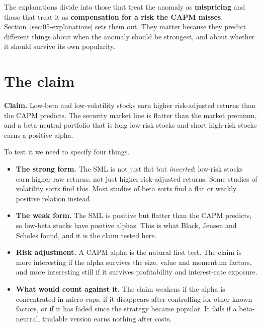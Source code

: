 The explanations divide into those that treat the anomaly as \textbf{mispricing} and those that treat it as \textbf{compensation for a risk the CAPM misses}. Section~\ref{sec:05-explanations} sets them out. They matter because they predict different things about when the anomaly should be strongest, and about whether it should survive its own popularity.

\section{The claim}
\label{sec:05-claim}

\begin{callout}
\textbf{Claim.} Low-beta and low-volatility stocks earn higher risk-adjusted returns than the CAPM predicts. The security market line is flatter than the market premium, and a beta-neutral portfolio that is long low-risk stocks and short high-risk stocks earns a positive alpha.
\end{callout}

To test it we need to specify four things.

\begin{itemize}
  \item \textbf{The strong form.} The SML is not just flat but \emph{inverted}: low-risk stocks earn higher raw returns, not just higher risk-adjusted returns. Some studies of volatility sorts find this. Most studies of beta sorts find a flat or weakly positive relation instead.
  \item \textbf{The weak form.} The SML is positive but flatter than the CAPM predicts, so low-beta stocks have positive alphas. This is what Black, Jensen and Scholes found, and it is the claim tested here.
  \item \textbf{Risk adjustment.} A CAPM alpha is the natural first test. The claim is more interesting if the alpha survives the size, value and momentum factors, and more interesting still if it survives profitability and interest-rate exposure.
  \item \textbf{What would count against it.} The claim weakens if the alpha is concentrated in micro-caps, if it disappears after controlling for other known factors, or if it has faded since the strategy became popular. It fails if a beta-neutral, tradable version earns nothing after costs.
\end{itemize}

